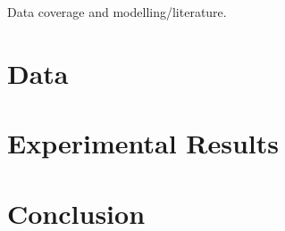 \documentclass[12pt,twoside]{report}
\begin{document}
Data coverage and modelling/literature. 
\chapter{Data}\label{sec:Data}


\chapter{Experimental Results}


\chapter{Conclusion}




\end{document}
